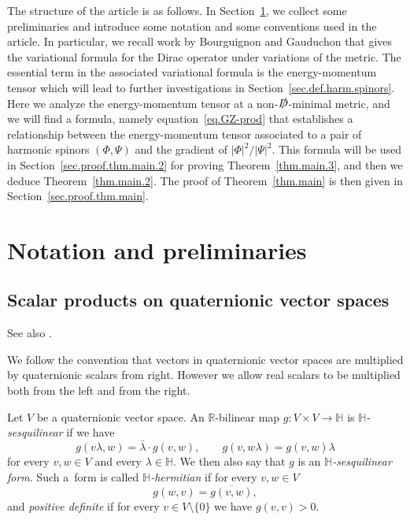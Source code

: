 \documentclass[pdftex]{sigma}
\newcommand\Dirac{\slashed{D}} %
\newcommand\Dminimal{$\Dirac$-minimal}
\newcommand\<{\langle}
\renewcommand\>{\rangle}
\newcommand{\HH}{\mathbb{H}}
\newcommand{\RR}{\mathbb R}
\theoremstyle{definition}
\let\define\emph
\newcommand\={\,=\,}
\numberwithin{equation}{section}
\begin{document}
The structure of the article is as follows. In Section~\ref{sec.prelim}, we collect some preliminaries and introduce some notation and some conventions used in the article. In particular, we recall work by Bourguignon and Gauduchon \cite{bourguignon.gauduchon:92} that gives the variational formula for the Dirac operator under variations of the metric. The essential term in the associated variational formula is the energy-momentum tensor which will lead to further investigations in Section~\ref{sec.def.harm.spinors}. Here we analyze the energy-momentum tensor at a non-\Dminimal{} metric, and we will find a formula, namely equation~\eqref{eq.GZ-prod} that establishes a relationship between the energy-momentum tensor associated to a pair of harmonic spinors $(\Phi,\Psi)$ and the gradient of $|\Phi|^2/|\Psi|^2$. This formula will be used in Section~\ref{sec.proof.thm.main.2} for proving Theorem~\ref{thm.main.3}, and then we deduce Theorem~\ref{thm.main.2}. The proof of Theorem~\ref{thm.main} is then given in Section~\ref{sec.proof.thm.main}.

\section{Notation and preliminaries}\label{sec.prelim}

\subsection{Scalar products on quaternionic vector spaces}

See also \cite[Chapter~2]{harvey:90}.

We follow the convention that vectors in quaternionic vector spaces are multiplied by quaternionic scalars from right. However we allow real scalars to be multiplied both from the left and from the right.

Let $V$ be a quaternionic vector space. An $\RR$-bilinear map $g\colon V\times V \to \HH$ is \define{$\HH$-sesquilinear} if we have
\begin{equation*}
g(v\lambda,w)= \bar{\lambda} \cdot g(v,w),\qquad g(v,w\lambda)= g(v,w)\lambda
\end{equation*}
for every $v,w\in V$ and every $\lambda\in \HH$. We then also say that $g$ is an \define{$\HH$-sesquilinear form}.
Such a~form is called \define{$\HH$-hermitian} if for every $v,w\in V$
\begin{equation}\label{eq.HH.hermitian}
g(w,v)= \overline{g(v,w)},
\end{equation}
and \define{positive definite} if for every $v\in V\setminus \{0\}$ we have $g(v,v)>0$.
\end{document}
